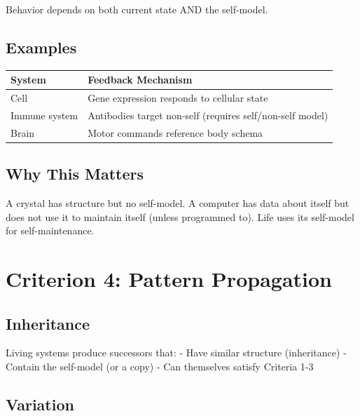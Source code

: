 \documentclass[
  11pt,
  letterpaper,
  twoside,
  openright]{book}
\begin{document}
Behavior depends on both current state AND the self-model.

\subsection{Examples}\label{examples-4}

\begin{longtable}[]{@{}
  >{\raggedright\arraybackslash}p{}
  >{\raggedright\arraybackslash}p{}@{}}
\toprule\noalign{}
\begin{minipage}[b]{\linewidth}\raggedright
System
\end{minipage} & \begin{minipage}[b]{\linewidth}\raggedright
Feedback Mechanism
\end{minipage} \\
\midrule\noalign{}
\endhead
\bottomrule\noalign{}
\endlastfoot
Cell & Gene expression responds to cellular state \\
Immune system & Antibodies target non-self (requires self/non-self
model) \\
Brain & Motor commands reference body schema \\
\end{longtable}

\subsection{Why This Matters}\label{why-this-matters}

A crystal has structure but no self-model. A computer has data about
itself but does not use it to maintain itself (unless programmed to).
Life uses its self-model for self-maintenance.

\section{Criterion 4: Pattern
Propagation}\label{criterion-4-pattern-propagation}

\subsection{Inheritance}\label{inheritance}

Living systems produce successors that: - Have similar structure
(inheritance) - Contain the self-model (or a copy) - Can themselves
satisfy Criteria 1-3

\subsection{Variation}\label{variation}
\end{document}
